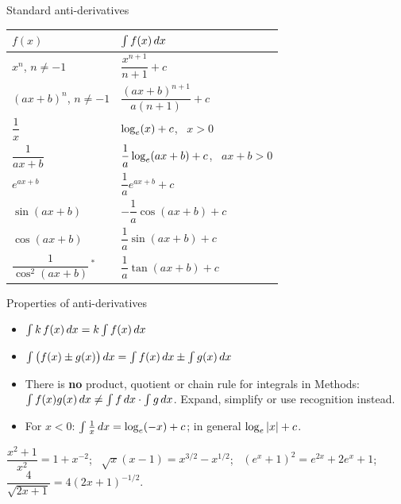 \begin{cols}[0.5]
\begin{keyres}{Standard anti-derivatives}
\renewcommand{\arraystretch}{1.55}
\begin{tabular}{@{}l@{\quad}l@{}}
$f(x)$ & $\int f(x)\,dx$ \\ \hline
$x^n$, $n\ne-1$ & $\dfrac{x^{n+1}}{n+1}+c$ \\
$(ax+b)^n$, $n\ne-1$ & $\dfrac{(ax+b)^{n+1}}{a(n+1)}+c$ \\
$\dfrac1x$ & $\log_e(x)+c$, \ $x>0$ \\
$\dfrac{1}{ax+b}$ & $\dfrac1a\log_e(ax+b)+c$, \ $ax+b>0$ \\
$e^{ax+b}$ & $\dfrac1ae^{ax+b}+c$ \\
$\sin(ax+b)$ & $-\dfrac1a\cos(ax+b)+c$ \\
$\cos(ax+b)$ & $\dfrac1a\sin(ax+b)+c$ \\
$\dfrac{1}{\cos^2(ax+b)}$\,$^{*}$ & $\dfrac1a\tan(ax+b)+c$ \\
\end{tabular}
\par{}
\end{keyres}
\nextcol[0.475]
\begin{keyres}{Properties of anti-derivatives}
\begin{itemize}
  \item $\int k\,f(x)\,dx=k\int f(x)\,dx$
  \item $\int\big(f(x)\pm g(x)\big)\,dx=\int f(x)\,dx\pm\int g(x)\,dx$
  \item There is \textbf{no} product, quotient or chain rule for integrals in Methods: $\int f(x)g(x)\,dx\ne\int f\,dx\cdot\int g\,dx$. Expand, simplify or use recognition instead.
  \item For $x<0$: $\int\frac1x\,dx=\log_e(-x)+c$; in general $\log_e|x|+c$.
\end{itemize}
\end{keyres}
\begin{tip}
$\dfrac{x^2+1}{x^2}=1+x^{-2}$; \ $\sqrt x(x-1)=x^{3/2}-x^{1/2}$; \ $(e^x+1)^2=e^{2x}+2e^x+1$; \ $\dfrac{4}{\sqrt{2x+1}}=4(2x+1)^{-1/2}$.
\end{tip}
\end{cols}

